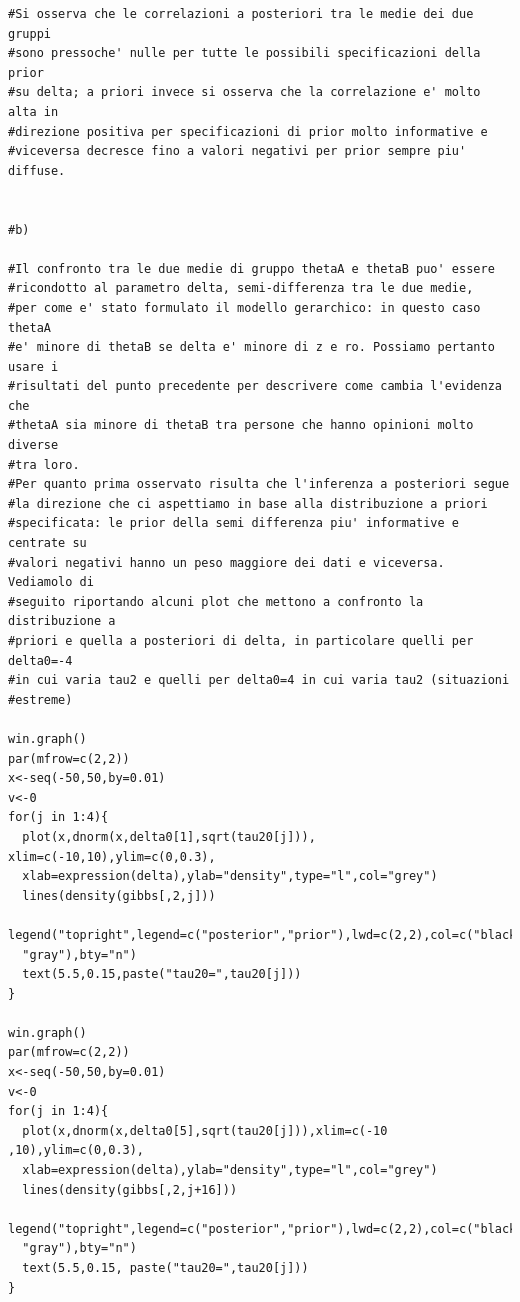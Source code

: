 \begin{itemize}
\begin{lstlisting}[style=R]
#Si osserva che le correlazioni a posteriori tra le medie dei due gruppi
#sono pressoche' nulle per tutte le possibili specificazioni della prior
#su delta; a priori invece si osserva che la correlazione e' molto alta in
#direzione positiva per specificazioni di prior molto informative e
#viceversa decresce fino a valori negativi per prior sempre piu' diffuse.


#b)

#Il confronto tra le due medie di gruppo thetaA e thetaB puo' essere
#ricondotto al parametro delta, semi-differenza tra le due medie,
#per come e' stato formulato il modello gerarchico: in questo caso thetaA
#e' minore di thetaB se delta e' minore di z e ro. Possiamo pertanto usare i
#risultati del punto precedente per descrivere come cambia l'evidenza che
#thetaA sia minore di thetaB tra persone che hanno opinioni molto diverse
#tra loro.
#Per quanto prima osservato risulta che l'inferenza a posteriori segue
#la direzione che ci aspettiamo in base alla distribuzione a priori
#specificata: le prior della semi differenza piu' informative e centrate su
#valori negativi hanno un peso maggiore dei dati e viceversa. Vediamolo di
#seguito riportando alcuni plot che mettono a confronto la distribuzione a
#priori e quella a posteriori di delta, in particolare quelli per delta0=-4
#in cui varia tau2 e quelli per delta0=4 in cui varia tau2 (situazioni
#estreme)

win.graph()
par(mfrow=c(2,2))
x<-seq(-50,50,by=0.01)
v<-0
for(j in 1:4){
  plot(x,dnorm(x,delta0[1],sqrt(tau20[j])), xlim=c(-10,10),ylim=c(0,0.3),
  xlab=expression(delta),ylab="density",type="l",col="grey")
  lines(density(gibbs[,2,j]))
  legend("topright",legend=c("posterior","prior"),lwd=c(2,2),col=c("black",
  "gray"),bty="n")
  text(5.5,0.15,paste("tau20=",tau20[j]))
}

win.graph()
par(mfrow=c(2,2))
x<-seq(-50,50,by=0.01)
v<-0
for(j in 1:4){
  plot(x,dnorm(x,delta0[5],sqrt(tau20[j])),xlim=c(-10 ,10),ylim=c(0,0.3),
  xlab=expression(delta),ylab="density",type="l",col="grey")
  lines(density(gibbs[,2,j+16]))
  legend("topright",legend=c("posterior","prior"),lwd=c(2,2),col=c("black",
  "gray"),bty="n")
  text(5.5,0.15, paste("tau20=",tau20[j]))
}


\end{lstlisting}
\end{itemize}
